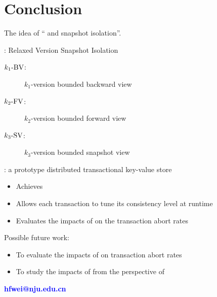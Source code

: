 \section{Conclusion}

\begin{frame}{}
  The idea of {\large `` and  snapshot isolation''}.

  \vspace{0.50cm}
  \blue{\rvsi{}}: Relaxed Version Snapshot Isolation
  \begin{description}
    \item[$k_1\text{-BV}$:] $k_1$-version bounded backward view
    \item[$k_2\text{-FV}$:] $k_2$-version bounded forward view
    \item[$\kthreesv$:] $k_3$-version bounded snapshot view
  \end{description}

  \vspace{10pt}
  \red{\chameleon{}}: a prototype distributed transactional key-value store
  \begin{itemize}
    \item Achieves \rvsi{}
    \item Allows each transaction to tune its consistency level at runtime
    \item Evaluates the impacts of \rvsi{} on the transaction abort rates
  \end{itemize}
\end{frame}

\begin{frame}{}
  Possible future work:
  \begin{itemize}
    \item To evaluate the impacts of \blue{$\kthreesv$} on transaction abort rates
    \item To study the impacts of \rvsi{} from the perspective of 
  \end{itemize}
\end{frame}

\begin{frame}[noframenumbering]
  \vspace{-0.8cm}
  \begin{center}
    \textcolor{blue}{\bf \large hfwei@nju.edu.cn}
  \end{center}
  \vspace{-0.5cm}
\end{frame}
